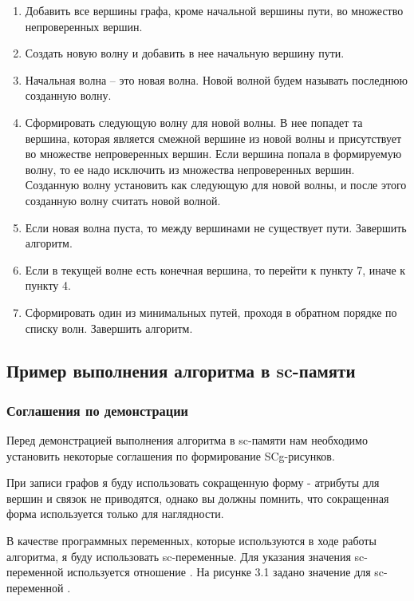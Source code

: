 \begin{enumerate}
\item Добавить все вершины графа, кроме начальной вершины пути, во
  множество непроверенных вершин.
\item Создать новую волну и добавить в нее начальную вершину пути.
\item Начальная волна – это новая волна. Новой волной будем называть
  последнюю созданную волну.
\item Сформировать следующую волну для новой волны. В нее попадет та
  вершина, которая является смежной вершине из новой волны и
  присутствует во множестве непроверенных вершин. Если вершина попала
  в формируемую волну, то ее надо исключить из множества непроверенных
  вершин. Созданную волну установить как следующую для новой волны, и
  после этого созданную волну считать новой волной.
\item Если новая волна пуста, то между вершинами не существует
  пути. Завершить алгоритм.
\item Если в текущей волне есть конечная вершина, то перейти к пункту
  7, иначе к пункту 4.
\item Сформировать один из минимальных путей, проходя в обратном
  порядке по списку волн. Завершить алгоритм.
\end{enumerate}

\subsection{Пример выполнения алгоритма в sc-памяти}
\label{sec:AlgoDemo_example}

\subsubsection{Соглашения по демонстрации}
\label{sec:AlgoDemo_demo_conv}

Перед демонстрацией выполнения алгоритма в sc-памяти нам необходимо
установить некоторые соглашения по формирование SCg-рисунков.

При записи графов я буду использовать сокращенную форму - атрибуты для
вершин и связок не приводятся, однако вы должны помнить, что
сокращенная форма используется только для наглядности.

В качестве программных переменных, которые используются в ходе работы
алгоритма, я буду использовать sc-переменные. Для указания значения
sc-переменной используется отношение .  На рисунке 3.1
задано значение для sc-переменной .

